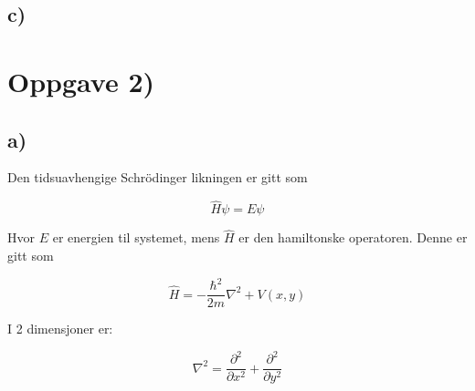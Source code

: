 \documentclass[a4paper,norsk, 10pt]{article}
\numberwithin{equation}{section}
\begin{document}
\subsection*{c)}
%
%
%
%
%
%
%
%
%






\section{Oppgave 2)}

\subsection*{a)}

Den tidsuavhengige Schrödinger likningen er gitt som 

\begin{equation}
\hat{H}\psi = E\psi
\label{eq:TUSL}
\end{equation}

Hvor $E$ er energien til systemet, mens $\hat{H}$ er den hamiltonske operatoren. Denne er gitt som

$$
\hat{H} = -\frac{\hbar^2}{2m}\nabla^2  + V(x,y)
$$

I 2 dimensjoner er:

$$
\nabla^2 = \frac{\partial^2}{\partial x^2} + \frac{\partial^2}{\partial y^2}
$$
\end{document}
